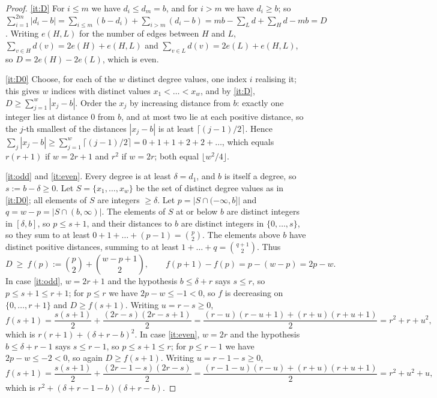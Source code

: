 \documentclass[11pt,a4paper]{article}
\theoremstyle{plain}
\theoremstyle{definition}
\theoremstyle{remark}
\newcommand{\fl}[1]{\lfloor #1\rfloor}
\newcommand{\ce}[1]{\lceil #1\rceil}
\begin{document}
\label{pf:spread}
\lemspread*
\begin{proof}
\ref{it:D} For $i\le m$ we have $d_i\le d_m=b$, and for $i>m$ we have $d_i\ge b$; so $\sum_{i=1}^{2m}|d_i-b|=\sum_{i\le m}(b-d_i)+\sum_{i>m}(d_i-b)=mb-\sum_L d+\sum_H d-mb=D$. Writing $e(H,L)$ for the number of edges between $H$ and $L$, $\sum_{v\in H}d(v)=2e(H)+e(H,L)$ and $\sum_{v\in L}d(v)=2e(L)+e(H,L)$, so $D=2e(H)-2e(L)$, which is even.

\ref{it:D0} Choose, for each of the $w$ distinct degree values, one index $i$ realising it; this gives $w$ indices with distinct values $x_1<\dots<x_w$, and by \ref{it:D}, $D\ge\sum_{j=1}^w|x_j-b|$. Order the $x_j$ by increasing distance from $b$: exactly one integer lies at distance $0$ from $b$, and at most two lie at each positive distance, so the $j$-th smallest of the distances $|x_j-b|$ is at least $\ce{(j-1)/2}$. Hence $\sum_j|x_j-b|\ge\sum_{j=1}^w\ce{(j-1)/2}=0+1+1+2+2+\dots$, which equals $r(r+1)$ if $w=2r+1$ and $r^2$ if $w=2r$; both equal $\fl{w^2/4}$.

\ref{it:odd} and \ref{it:even}. Every degree is at least $\delta=d_1$, and $b$ is itself a degree, so $s:=b-\delta\ge0$. Let $S=\{x_1,\dots,x_w\}$ be the set of distinct degree values as in \ref{it:D0}; all elements of $S$ are integers $\ge\delta$. Let $p=|S\cap(-\infty,b]|$ and $q=w-p=|S\cap(b,\infty)|$. The elements of $S$ at or below $b$ are distinct integers in $[\delta,b]$, so $p\le s+1$, and their distances to $b$ are distinct integers in $\{0,\dots,s\}$, so they sum to at least $0+1+\dots+(p-1)=\binom p2$. The elements above $b$ have distinct positive distances, summing to at least $1+\dots+q=\binom{q+1}2$. Thus
\[
D\ \ge\ f(p):=\binom p2+\binom{w-p+1}{2},\qquad f(p+1)-f(p)=p-(w-p)=2p-w .
\]
In case \ref{it:odd}, $w=2r+1$ and the hypothesis $b\le\delta+r$ says $s\le r$, so $p\le s+1\le r+1$; for $p\le r$ we have $2p-w\le-1<0$, so $f$ is decreasing on $\{0,\dots,r+1\}$ and $D\ge f(s+1)$. Writing $u=r-s\ge0$,
\[
f(s+1)=\frac{s(s+1)}2+\frac{(2r-s)(2r-s+1)}2=\frac{(r-u)(r-u+1)+(r+u)(r+u+1)}2=r^2+r+u^2,
\]
which is $r(r+1)+(\delta+r-b)^2$. In case \ref{it:even}, $w=2r$ and the hypothesis $b\le\delta+r-1$ says $s\le r-1$, so $p\le s+1\le r$; for $p\le r-1$ we have $2p-w\le-2<0$, so again $D\ge f(s+1)$. Writing $u=r-1-s\ge0$,
\[
f(s+1)=\frac{s(s+1)}2+\frac{(2r-1-s)(2r-s)}2=\frac{(r-1-u)(r-u)+(r+u)(r+u+1)}2=r^2+u^2+u,
\]
which is $r^2+(\delta+r-1-b)(\delta+r-b)$.
\end{proof}
\end{document}
